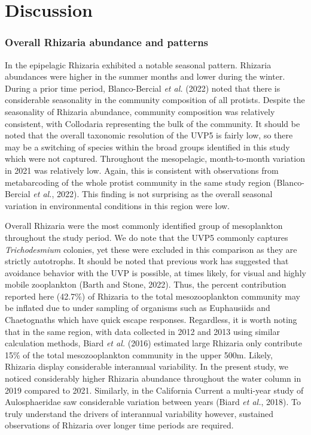 \documentclass[
]{article}
\begin{document}
\section{Discussion}\label{discussion}

\subsubsection{Overall Rhizaria abundance and
patterns}\label{overall-rhizaria-abundance-and-patterns}

In the epipelagic Rhizaria exhibited a notable seasonal pattern.
Rhizaria abundances were higher in the summer months and lower during
the winter. During a prior time period, Blanco-Bercial \emph{et al.}
(2022) noted that there is considerable seasonality in the community
composition of all protists. Despite the seasonality of Rhizaria
abundance, community composition was relatively consistent, with
Collodaria representing the bulk of the community. It should be noted
that the overall taxonomic resolution of the UVP5 is fairly low, so
there may be a switching of species within the broad groups identified
in this study which were not captured. Throughout the mesopelagic,
month-to-month variation in 2021 was relatively low. Again, this is
consistent with observations from metabarcoding of the whole protist
community in the same study region (Blanco-Bercial \emph{et al.}, 2022).
This finding is not surprising as the overall seasonal variation in
environmental conditions in this region were low.

Overall Rhizaria were the most commonly identified group of mesoplankton
throughout the study period. We do note that the UVP5 commonly captures
\emph{Trichodesmium} colonies, yet these were excluded in this
comparison as they are strictly autotrophs. It should be noted that
previous work has suggested that avoidance behavior with the UVP is
possible, at times likely, for visual and highly mobile zooplankton
(Barth and Stone, 2022). Thus, the percent contribution reported here
(42.7\%) of Rhizaria to the total mesozooplankton community may be
inflated due to under sampling of organisms such as Euphausiids and
Chaetognaths which have quick escape responses. Regardless, it is worth
noting that in the same region, with data collected in 2012 and 2013
using similar calculation methods, Biard \emph{et al.} (2016) estimated
large Rhizaria only contribute 15\% of the total mesozooplankton
community in the upper 500m. Likely, Rhizaria display considerable
interannual variability. In the present study, we noticed considerably
higher Rhizaria abundance throughout the water column in 2019 compared
to 2021. Similarly, in the California Current a multi-year study of
Aulosphaeridae saw considerable variation between years (Biard \emph{et
al.}, 2018). To truly understand the drivers of interannual variability
however, sustained observations of Rhizaria over longer time periods are
required.
\end{document}

